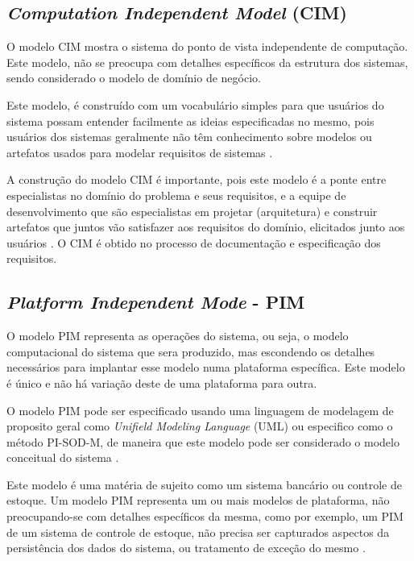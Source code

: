 \subsection{\textit{Computation Independent Model} (CIM)}

O modelo CIM mostra o sistema do ponto de vista independente de computação. Este modelo, não se preocupa com detalhes específicos da estrutura dos sistemas, sendo considerado o modelo de domínio de negócio. 

Este modelo, é construído com um vocabulário simples para que usuários do sistema possam entender facilmente as ideias especificadas no mesmo, pois usuários dos sistemas geralmente não têm conhecimento sobre modelos ou artefatos usados para modelar requisitos de sistemas \cite{miller2003}. 

A construção do modelo CIM é importante, pois este modelo é a ponte entre especialistas no domínio do problema e seus requisitos, e a equipe de desenvolvimento que são especialistas em projetar (arquitetura) e construir artefatos que juntos vão satisfazer aos requisitos do domínio, elicitados junto aos usuários \cite{miller2003}. O CIM é obtido no processo de documentação e especificação dos requisitos.

\subsection{\textit{Platform Independent Mode} - PIM}

O modelo PIM representa as operações do sistema, ou seja, o modelo computacional do sistema que sera produzido, mas escondendo os detalhes necessários para implantar esse modelo numa plataforma específica. Este modelo é único e não há variação deste de uma plataforma para outra. 

O modelo PIM pode ser especificado usando uma linguagem de modelagem de proposito geral como \textit{Unifield Modeling Language} (UML) ou especifico como o método PI-SOD-M, de maneira que este modelo pode ser considerado o modelo conceitual do sistema \cite{miller2003}.

Este modelo é uma matéria de sujeito como um sistema bancário ou controle de estoque. Um modelo PIM representa um ou mais modelos de plataforma, não preocupando-se com detalhes específicos da mesma, como por exemplo, um PIM de um sistema de controle de estoque, não precisa ser capturados aspectos da persistência dos dados do sistema, ou tratamento de exceção do mesmo \cite{miller2003}.


